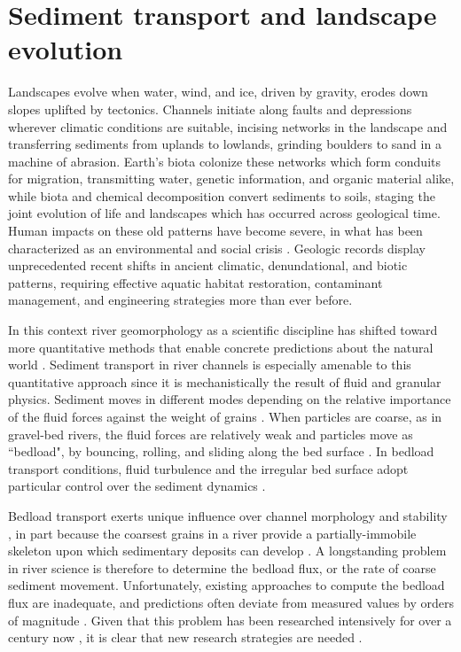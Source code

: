 
\chapter{Sediment transport and landscape evolution}
\label{ch:Introduction}

Landscapes evolve when water, wind, and ice, driven by gravity, erodes down slopes uplifted by tectonics.
Channels initiate along faults and depressions wherever climatic conditions are suitable, incising networks in the landscape and transferring sediments from uplands to lowlands, grinding boulders to sand in a machine of abrasion.
Earth's biota colonize these networks which form conduits for migration, transmitting water, genetic information, and organic material alike, while biota and chemical decomposition convert sediments to soils, staging the joint evolution of life and landscapes which has occurred across geological time.
Human impacts on these old patterns have become severe, in what has been characterized as an environmental and social crisis \citep{Slaymaker2020}.
Geologic records display unprecedented recent shifts in ancient climatic, denundational, and biotic patterns, requiring effective aquatic habitat restoration, contaminant management, and engineering strategies more than ever before.

In this context river geomorphology as a scientific discipline has shifted toward more quantitative methods that enable concrete predictions about the natural world \citep{Church2005}.
Sediment transport in river channels is especially amenable to this quantitative approach since it is mechanistically the result of fluid and granular physics.
Sediment moves in different modes depending on the relative importance of the fluid forces against the weight of grains \citep{Bagnold1956}.
When particles are coarse, as in gravel-bed rivers, the fluid forces are relatively weak and particles move as ``bedload", by bouncing, rolling, and sliding along the bed surface \citep{Kalinske1947}. In bedload transport conditions, fluid turbulence and the irregular bed surface adopt particular control over the sediment dynamics \citep{Frey2009,Frey2011}.

Bedload transport exerts unique influence over channel morphology and stability \citep{Church2006,Recking2016}, in part because the coarsest grains in a river provide a partially-immobile skeleton upon which sedimentary deposits can develop \citep{Hassan2008, Eaton2020}.
A longstanding problem in river science is therefore to determine the bedload flux, or the rate of coarse sediment movement.
Unfortunately, existing approaches to compute the bedload flux are inadequate, and predictions often deviate from measured values by orders of magnitude \citep{Gomez1989, Barry2004, Bathurst2007a, Recking2012}.
Given that this problem has been researched intensively for over a century now \citep{Gilbert1914}, it is clear that new research strategies are needed \citep{Ancey2020a,Ancey2020}.

